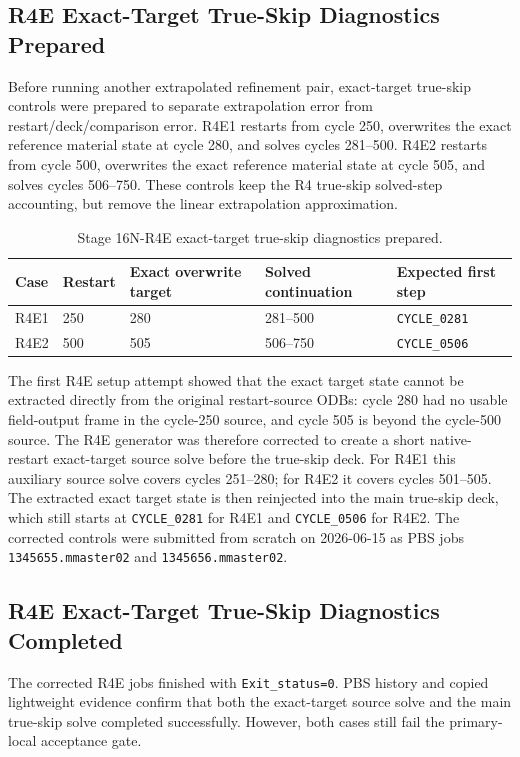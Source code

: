 \documentclass[11pt,a4paper]{article}
\newcommand{\code}[1]{\texttt{#1}}
\begin{document}
\subsection{R4E Exact-Target True-Skip Diagnostics Prepared}

Before running another extrapolated refinement pair, exact-target true-skip controls were prepared to separate extrapolation error from restart/deck/comparison error. R4E1 restarts from cycle 250, overwrites the exact reference material state at cycle 280, and solves cycles 281--500. R4E2 restarts from cycle 500, overwrites the exact reference material state at cycle 505, and solves cycles 506--750. These controls keep the R4 true-skip solved-step accounting, but remove the linear extrapolation approximation.

\begin{table}[H]
\centering
\caption{Stage 16N-R4E exact-target true-skip diagnostics prepared.}
\begin{tabular}{lllll}
\toprule
Case & Restart & Exact overwrite target & Solved continuation & Expected first step \\
\midrule
R4E1 & 250 & 280 & 281--500 & \code{CYCLE\_0281} \\
R4E2 & 500 & 505 & 506--750 & \code{CYCLE\_0506} \\
\bottomrule
\end{tabular}
\end{table}

The first R4E setup attempt showed that the exact target state cannot be extracted directly from the original restart-source ODBs: cycle 280 had no usable field-output frame in the cycle-250 source, and cycle 505 is beyond the cycle-500 source. The R4E generator was therefore corrected to create a short native-restart exact-target source solve before the true-skip deck. For R4E1 this auxiliary source solve covers cycles 251--280; for R4E2 it covers cycles 501--505. The extracted exact target state is then reinjected into the main true-skip deck, which still starts at \code{CYCLE\_0281} for R4E1 and \code{CYCLE\_0506} for R4E2. The corrected controls were submitted from scratch on 2026-06-15 as PBS jobs \code{1345655.mmaster02} and \code{1345656.mmaster02}.

\subsection{R4E Exact-Target True-Skip Diagnostics Completed}

The corrected R4E jobs finished with \code{Exit\_status=0}. PBS history and copied lightweight evidence confirm that both the exact-target source solve and the main true-skip solve completed successfully. However, both cases still fail the primary-local acceptance gate.
\end{document}
